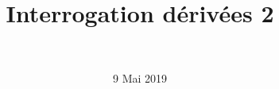 \documentclass[a4paper,11pt]{exam}
\author{\ }
\date{9 Mai 2019}
\title{Interrogation dérivées 2}
\begin{document}
%	

\maketitle







\label{LastPage}

\newpage

\setcounter{page}{1}
\maketitle



\end{document}

